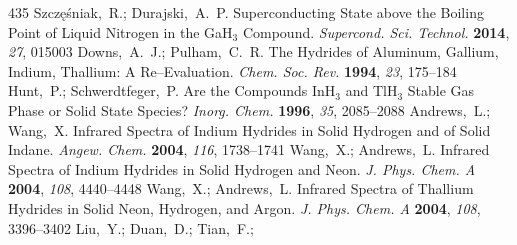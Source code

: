 \documentclass[12pt,letterpaper,oneside]{article}
\begin{document}
\begin{mcitethebibliography}{435}
\mciteSetBstMidEndSepPunct{\mcitedefaultmidpunct}
{\mcitedefaultendpunct}{\mcitedefaultseppunct}\relax
\EndOfBibitem
{}
Szcz{\k e}{\'s}niak,~R.; Durajski,~A.~P. Superconducting State above the
  Boiling Point of Liquid Nitrogen in the GaH$_{3}$ Compound. \emph{Supercond.
  Sci. Technol.} \textbf{2014}, \emph{27}, 015003\relax
\mciteBstWouldAddEndPuncttrue
\mciteSetBstMidEndSepPunct{\mcitedefaultmidpunct}
{\mcitedefaultendpunct}{\mcitedefaultseppunct}\relax
\EndOfBibitem
{}
Downs,~A.~J.; Pulham,~C.~R. The Hydrides of Aluminum, Gallium, Indium,
  Thallium: A Re--Evaluation. \emph{Chem. Soc. Rev.} \textbf{1994}, \emph{23},
  175--184\relax
\mciteBstWouldAddEndPuncttrue
\mciteSetBstMidEndSepPunct{\mcitedefaultmidpunct}
{\mcitedefaultendpunct}{\mcitedefaultseppunct}\relax
\EndOfBibitem
{}
Hunt,~P.; Schwerdtfeger,~P. Are the Compounds InH$_3$ and TlH$_3$ Stable Gas
  Phase or Solid State Species? \emph{Inorg. Chem.} \textbf{1996}, \emph{35},
  2085--2088\relax
\mciteBstWouldAddEndPuncttrue
\mciteSetBstMidEndSepPunct{\mcitedefaultmidpunct}
{\mcitedefaultendpunct}{\mcitedefaultseppunct}\relax
\EndOfBibitem
{}
Andrews,~L.; Wang,~X. Infrared Spectra of Indium Hydrides in Solid Hydrogen and
  of Solid Indane. \emph{Angew. Chem.} \textbf{2004}, \emph{116},
  1738--1741\relax
\mciteBstWouldAddEndPuncttrue
\mciteSetBstMidEndSepPunct{\mcitedefaultmidpunct}
{\mcitedefaultendpunct}{\mcitedefaultseppunct}\relax
\EndOfBibitem
{}
Wang,~X.; Andrews,~L. Infrared Spectra of Indium Hydrides in Solid Hydrogen and
  Neon. \emph{J. Phys. Chem. A} \textbf{2004}, \emph{108}, 4440--4448\relax
\mciteBstWouldAddEndPuncttrue
\mciteSetBstMidEndSepPunct{\mcitedefaultmidpunct}
{\mcitedefaultendpunct}{\mcitedefaultseppunct}\relax
\EndOfBibitem
{}
Wang,~X.; Andrews,~L. Infrared Spectra of Thallium Hydrides in Solid Neon,
  Hydrogen, and Argon. \emph{J. Phys. Chem. A} \textbf{2004}, \emph{108},
  3396--3402\relax
\mciteBstWouldAddEndPuncttrue
\mciteSetBstMidEndSepPunct{\mcitedefaultmidpunct}
{\mcitedefaultendpunct}{\mcitedefaultseppunct}\relax
\EndOfBibitem
{}
Liu,~Y.; Duan,~D.; Tian,~F.; 

\end{mcitethebibliography}
\end{document}
